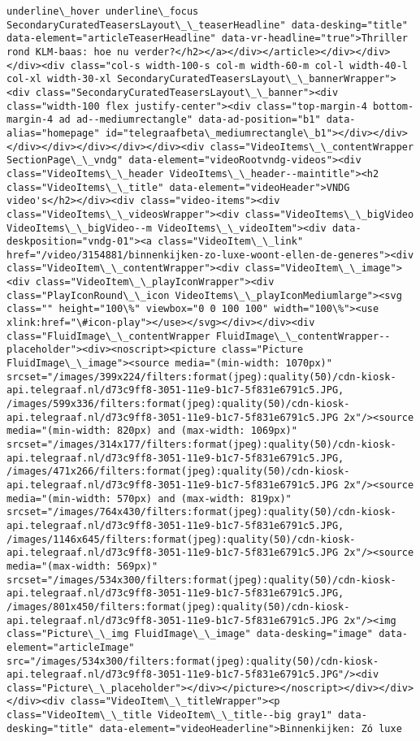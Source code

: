 \documentclass[11pt]{article}
\begin{document}
\begin{Verbatim}[commandchars=\\\{\}]
underline\_hover underline\_focus SecondaryCuratedTeasersLayout\_\_teaserHeadline" data-desking="title" data-element="articleTeaserHeadline" data-vr-headline="true">Thriller rond KLM-baas: hoe nu verder?</h2></a></div></article></div></div></div><div class="col-s width-100-s col-m width-60-m col-l width-40-l col-xl width-30-xl SecondaryCuratedTeasersLayout\_\_bannerWrapper"><div class="SecondaryCuratedTeasersLayout\_\_banner"><div class="width-100 flex justify-center"><div class="top-margin-4 bottom-margin-4 ad ad--mediumrectangle" data-ad-position="b1" data-alias="homepage" id="telegraafbeta\_mediumrectangle\_b1"></div></div></div></div></div></div></div><div class="VideoItems\_\_contentWrapper SectionPage\_\_vndg" data-element="videoRootvndg-videos"><div class="VideoItems\_\_header VideoItems\_\_header--maintitle"><h2 class="VideoItems\_\_title" data-element="videoHeader">VNDG video's</h2></div><div class="video-items"><div class="VideoItems\_\_videosWrapper"><div class="VideoItems\_\_bigVideo VideoItems\_\_bigVideo--m VideoItems\_\_videoItem"><div data-deskposition="vndg-01"><a class="VideoItem\_\_link" href="/video/3154881/binnenkijken-zo-luxe-woont-ellen-de-generes"><div class="VideoItem\_\_contentWrapper"><div class="VideoItem\_\_image"><div class="VideoItem\_\_playIconWrapper"><div class="PlayIconRound\_\_icon VideoItems\_\_playIconMediumlarge"><svg class="" height="100\%" viewbox="0 0 100 100" width="100\%"><use xlink:href="\#icon-play"></use></svg></div></div><div class="FluidImage\_\_contentWrapper FluidImage\_\_contentWrapper--placeholder"><div><noscript><picture class="Picture FluidImage\_\_image"><source media="(min-width: 1070px)" srcset="/images/399x224/filters:format(jpeg):quality(50)/cdn-kiosk-api.telegraaf.nl/d73c9ff8-3051-11e9-b1c7-5f831e6791c5.JPG, /images/599x336/filters:format(jpeg):quality(50)/cdn-kiosk-api.telegraaf.nl/d73c9ff8-3051-11e9-b1c7-5f831e6791c5.JPG 2x"/><source media="(min-width: 820px) and (max-width: 1069px)" srcset="/images/314x177/filters:format(jpeg):quality(50)/cdn-kiosk-api.telegraaf.nl/d73c9ff8-3051-11e9-b1c7-5f831e6791c5.JPG, /images/471x266/filters:format(jpeg):quality(50)/cdn-kiosk-api.telegraaf.nl/d73c9ff8-3051-11e9-b1c7-5f831e6791c5.JPG 2x"/><source media="(min-width: 570px) and (max-width: 819px)" srcset="/images/764x430/filters:format(jpeg):quality(50)/cdn-kiosk-api.telegraaf.nl/d73c9ff8-3051-11e9-b1c7-5f831e6791c5.JPG, /images/1146x645/filters:format(jpeg):quality(50)/cdn-kiosk-api.telegraaf.nl/d73c9ff8-3051-11e9-b1c7-5f831e6791c5.JPG 2x"/><source media="(max-width: 569px)" srcset="/images/534x300/filters:format(jpeg):quality(50)/cdn-kiosk-api.telegraaf.nl/d73c9ff8-3051-11e9-b1c7-5f831e6791c5.JPG, /images/801x450/filters:format(jpeg):quality(50)/cdn-kiosk-api.telegraaf.nl/d73c9ff8-3051-11e9-b1c7-5f831e6791c5.JPG 2x"/><img class="Picture\_\_img FluidImage\_\_image" data-desking="image" data-element="articleImage" src="/images/534x300/filters:format(jpeg):quality(50)/cdn-kiosk-api.telegraaf.nl/d73c9ff8-3051-11e9-b1c7-5f831e6791c5.JPG"/><div class="Picture\_\_placeholder"></div></picture></noscript></div></div></div><div class="VideoItem\_\_titleWrapper"><p class="VideoItem\_\_title VideoItem\_\_title--big gray1" data-desking="title" data-element="videoHeaderline">Binnenkijken: Zó luxe 
\end{Verbatim}
\end{document}
